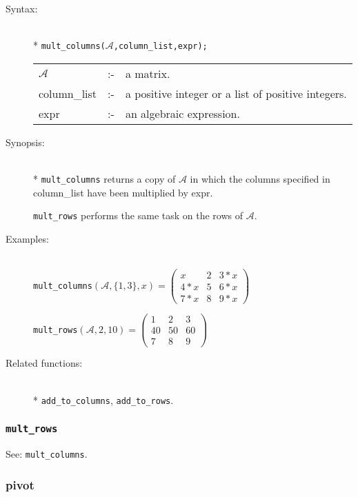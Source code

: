 \begin{description}
\item[Syntax:]\mbox{}\\*
\texttt{mult\_columns($\mathcal{A}$,column\_list,expr);}\\[2mm]
\begin{tabular}{l l l}
$\mathcal{A}$   &:-& a matrix. \\
column\_list &:-& a positive integer or a list of positive integers. \\
expr        &:-& an algebraic expression.
\end{tabular}

\item[Synopsis:]\mbox{}\\*
\texttt{mult\_columns} returns a copy of $\mathcal{A}$ in which
                the columns specified in column\_list have been
multiplied by expr.

\texttt{mult\_rows} performs the same task on the rows of $\mathcal{A}$.

\item[Examples:]\mbox{}\\
  \texttt{mult\_columns}\((\mathcal{A},\{1,3\},x)  =
  \begin{pmatrix} x & 2 & 3*x \\ 4*x & 5 & 6*x \\ 7*x & 8 & 9*x \end{pmatrix}\)

  \texttt{mult\_rows}\((\mathcal{A},2,10)  =
  \begin{pmatrix} 1 & 2 & 3 \\ 40 & 50 & 60 \\ 7 & 8 & 9 \end{pmatrix}\)

\item[Related functions:]\mbox{}\\*
\texttt{add\_to\_columns}, \texttt{add\_to\_rows}.
\end{description}


\subsubsection{\texttt{mult\_rows}}
\label{linalg:mult_rows}
\hypertarget{operator:MULT_ROWS}{}
See: \texttt{mult\_columns}.


\subsubsection{pivot}
\label{linalg:pivot}
\hypertarget{operator:PIVOT}{}

